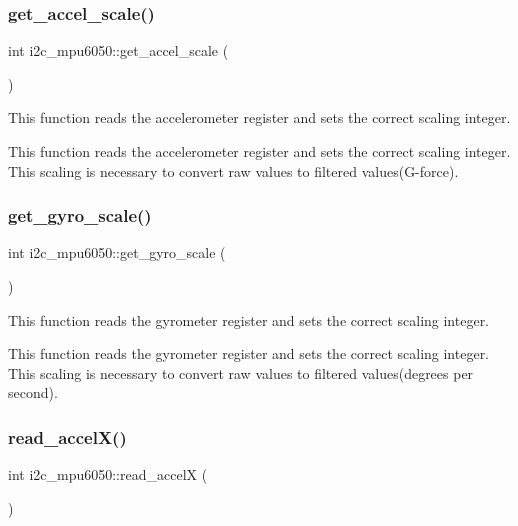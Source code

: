 \subsubsection{\texorpdfstring{get\+\_\+accel\+\_\+scale()}{get\_accel\_scale()}}
{\footnotesize\ttfamily int i2c\+\_\+mpu6050\+::get\+\_\+accel\+\_\+scale (\begin{DoxyParamCaption}{ }\end{DoxyParamCaption})}



This function reads the accelerometer register and sets the correct scaling integer. 

This function reads the accelerometer register and sets the correct scaling integer. This scaling is necessary to convert raw values to filtered values(G-\/force). \mbox{\label{classi2c__mpu6050_ad8b2972b2cb7f35c0737a3cc6ba35f68}} 
\subsubsection{\texorpdfstring{get\+\_\+gyro\+\_\+scale()}{get\_gyro\_scale()}}
{\footnotesize\ttfamily int i2c\+\_\+mpu6050\+::get\+\_\+gyro\+\_\+scale (\begin{DoxyParamCaption}{ }\end{DoxyParamCaption})}



This function reads the gyrometer register and sets the correct scaling integer. 

This function reads the gyrometer register and sets the correct scaling integer. This scaling is necessary to convert raw values to filtered values(degrees per second). \mbox{\label{classi2c__mpu6050_a9f2b78a6174b02bbac22fd21cbd18574}} 
\subsubsection{\texorpdfstring{read\+\_\+accel\+X()}{read\_accelX()}}
{\footnotesize\ttfamily int i2c\+\_\+mpu6050\+::read\+\_\+accelX (\begin{DoxyParamCaption}{ }\end{DoxyParamCaption})}




